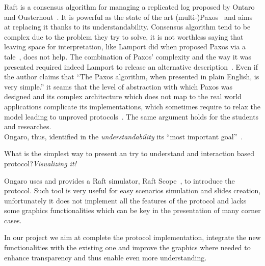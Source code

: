 Raft is a consensus algorithm for managing a replicated log
proposed by Ontaro and Ousterhout~\cite{ongaro2014search}.
It is powerful as the state of the art (multi-)Paxos~\cite{lamport1998part} and
aims at replacing it thanks to its understandability.
Consensus algorithm tend to be complex due to the problem they try to solve,
it is not worthless saying that leaving space for interpretation, like Lamport
did when proposed Paxos via a tale~\cite{lamport1998part}, does not help.
The combination of Paxos' complexity and the way it was presented required
indeed Lamport to release an alternative description~\cite{lamport2001paxos}.
Even if the author claims that ``The Paxos algorithm, when presented in plain
English, is very simple.'' it seams that the level of abstraction
with which Paxos was designed and its complex architecture which does not map
to the real world applications complicate its implementations, which sometimes
require to relax the model leading to unproved protocols~\cite{chandra2007paxos}.
The same argument holds for the students and researches.\\
Ongaro, thus, identified in the \emph{understandability} its ``most important goal''~\cite{ongaro2014consensus}.

What is the simplest way to present an try to understand and interaction based
protocol?\emph{Visualizing it!}

Ongaro uses and provides a Raft simulator, Raft Scope~\cite{raftscope}, to introduce the protocol.
Such tool is very useful for easy scenarios simulation and slides creation,
unfortunately it does not implement all the features of the protocol and lacks
some graphics functionalities which can be key in the presentation of
many corner cases.

In our project we aim at complete the protocol implementation, integrate the new
functionalities with the existing one and improve the graphics where needed to
enhance transparency and thus enable even more understanding.
